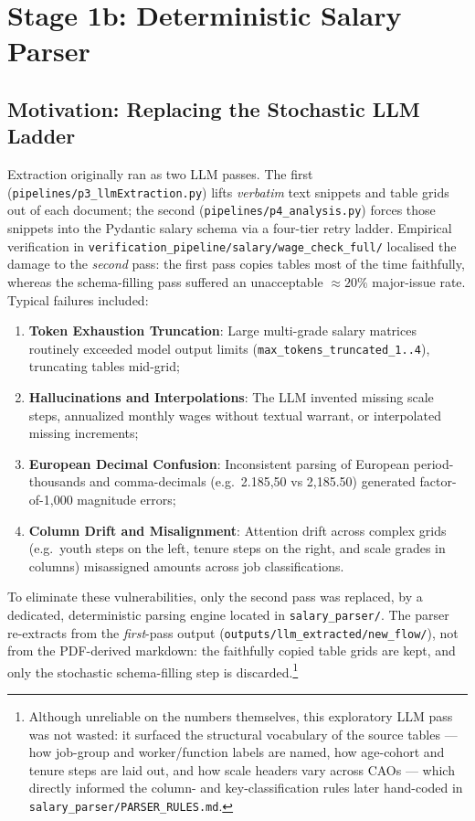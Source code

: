 \section{Stage 1b: Deterministic Salary Parser}
\label{sec:salary-parser}

\subsection{Motivation: Replacing the Stochastic LLM Ladder}

Extraction originally ran as two LLM passes. The first (\nolinkurl{pipelines/p3_llmExtraction.py}) lifts \emph{verbatim} text snippets and table grids out of each document; the second (\nolinkurl{pipelines/p4_analysis.py}) forces those snippets into the Pydantic salary schema via a four-tier retry ladder. Empirical verification in \nolinkurl{verification_pipeline/salary/wage_check_full/} localised the damage to the \emph{second} pass: the first pass copies tables most of the time faithfully, whereas the schema-filling pass suffered an unacceptable $\approx 20\%$ major-issue rate. Typical failures included:
\begin{enumerate}[leftmargin=1.5em]
  \item \textbf{Token Exhaustion Truncation}: Large multi-grade salary matrices routinely exceeded model output limits (\texttt{max\_tokens\_truncated\_1..4}), truncating tables mid-grid;
  \item \textbf{Hallucinations and Interpolations}: The LLM invented missing scale steps, annualized monthly wages without textual warrant, or interpolated missing increments;
  \item \textbf{European Decimal Confusion}: Inconsistent parsing of European period-thousands and comma-decimals (e.g.\ 2.185,50 vs 2,185.50) generated factor-of-1,000 magnitude errors;
  \item \textbf{Column Drift and Misalignment}: Attention drift across complex grids (e.g.\ youth steps on the left, tenure steps on the right, and scale grades in columns) misassigned amounts across job classifications.
\end{enumerate}
To eliminate these vulnerabilities, only the second pass was replaced, by a dedicated, deterministic parsing engine located in \nolinkurl{salary_parser/}. The parser re-extracts from the \emph{first}-pass output (\nolinkurl{outputs/llm_extracted/new_flow/}), not from the PDF-derived markdown: the faithfully copied table grids are kept, and only the stochastic schema-filling step is discarded.\footnote{ Although unreliable on the numbers themselves, this exploratory LLM pass was not wasted: it surfaced the structural vocabulary of the source tables --- how job-group and worker/function labels are named, how age-cohort and tenure steps are laid out, and how scale headers vary across CAOs --- which directly informed the column- and key-classification rules later hand-coded in \nolinkurl{salary_parser/PARSER_RULES.md}.}

